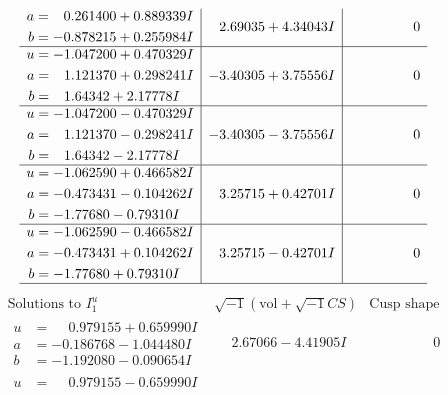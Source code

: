 \documentclass[1p]{elsarticle_modified}
\theoremstyle{definition}
\newcommand{\I}{\sqrt{-1}}
\begin{document}
$$\begin{array}{c|c|c}
\begin{aligned}
a &= \phantom{-}0.261400 + 0.889339 I \\
b &= -0.878215 + 0.255984 I\end{aligned}
 & \phantom{-}2.69035 + 4.34043 I & \phantom{-0.000000 } 0 \\ \hline\begin{aligned}
u &= -1.047200 + 0.470329 I \\
a &= \phantom{-}1.121370 + 0.298241 I \\
b &= \phantom{-}1.64342 + 2.17778 I\end{aligned}
 & -3.40305 + 3.75556 I & \phantom{-0.000000 } 0 \\ \hline\begin{aligned}
u &= -1.047200 - 0.470329 I \\
a &= \phantom{-}1.121370 - 0.298241 I \\
b &= \phantom{-}1.64342 - 2.17778 I\end{aligned}
 & -3.40305 - 3.75556 I & \phantom{-0.000000 } 0 \\ \hline\begin{aligned}
u &= -1.062590 + 0.466582 I \\
a &= -0.473431 - 0.104262 I \\
b &= -1.77680 - 0.79310 I\end{aligned}
 & \phantom{-}3.25715 + 0.42701 I & \phantom{-0.000000 } 0 \\ \hline\begin{aligned}
u &= -1.062590 - 0.466582 I \\
a &= -0.473431 + 0.104262 I \\
b &= -1.77680 + 0.79310 I\end{aligned}
 & \phantom{-}3.25715 - 0.42701 I & \phantom{-0.000000 } 0\\
 \hline 
 \end{array}$$\newpage$$\begin{array}{c|c|c}  
\text{Solutions to }I^u_{1}& \I (\text{vol} + \sqrt{-1}CS) & \text{Cusp shape}\\
 \hline 
\begin{aligned}
u &= \phantom{-}0.979155 + 0.659990 I \\
a &= -0.186768 - 1.044480 I \\
b &= -1.192080 - 0.090654 I\end{aligned}
 & \phantom{-}2.67066 - 4.41905 I & \phantom{-0.000000 } 0 \\ \hline\begin{aligned}
u &= \phantom{-}0.979155 - 0.659990 I \\

\end{aligned}
\end{array}$$
\end{document}
